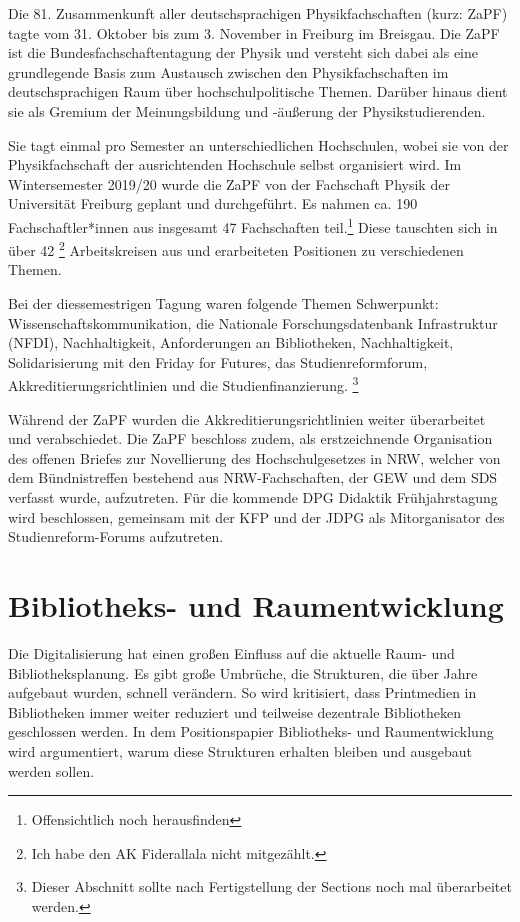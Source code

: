 Die 81. Zusammenkunft aller deutschsprachigen Physikfachschaften (kurz: ZaPF) tagte vom 31. Oktober bis zum 3. November in Freiburg im Breisgau. Die ZaPF ist die Bundesfachschaftentagung der Physik und versteht sich dabei als eine grundlegende Basis zum Austausch zwischen den Physikfachschaften im deutschsprachigen Raum über hochschulpolitische Themen. Darüber hinaus dient sie als Gremium der Meinungsbildung und -äußerung der Physikstudierenden.

Sie tagt einmal pro Semester an unterschiedlichen Hochschulen, wobei sie von der Physikfachschaft der ausrichtenden Hochschule selbst organisiert wird. 
Im Wintersemester 2019/20 wurde die ZaPF von der Fachschaft Physik der Universität Freiburg geplant und durchgeführt.  
Es nahmen ca. 190 Fachschaftler*innen aus insgesamt 47 Fachschaften teil.\footnote{Offensichtlich noch herausfinden}
Diese tauschten sich in über 42 \footnote{Ich habe den AK Fiderallala nicht mitgezählt.} Arbeitskreisen aus und erarbeiteten Positionen zu verschiedenen Themen.

Bei der diessemestrigen Tagung waren folgende Themen Schwerpunkt: Wissenschaftskommunikation, die Nationale Forschungsdatenbank Infrastruktur (NFDI), Nachhaltigkeit, Anforderungen an Bibliotheken, Nachhaltigkeit, Solidarisierung mit den Friday for Futures, das Studienreformforum, Akkreditierungsrichtlinien und die Studienfinanzierung. \footnote{Dieser Abschnitt sollte nach Fertigstellung der Sections noch mal überarbeitet werden.}

Während der ZaPF wurden die Akkreditierungsrichtlinien weiter überarbeitet und verabschiedet. Die ZaPF beschloss zudem, als erstzeichnende Organisation des offenen Briefes zur Novellierung des Hochschulgesetzes in NRW, welcher von dem Bündnistreffen bestehend aus NRW-Fachschaften, der GEW und dem SDS verfasst wurde, aufzutreten. Für die kommende DPG Didaktik Frühjahrstagung wird beschlossen, gemeinsam mit der KFP und der JDPG als Mitorganisator des Studienreform-Forums aufzutreten. 

\section*{Bibliotheks- und Raumentwicklung}
Die Digitalisierung hat einen großen Einfluss auf die aktuelle Raum- und Bibliotheksplanung. Es gibt große Umbrüche, die Strukturen, die über Jahre aufgebaut wurden, schnell verändern. So wird kritisiert, dass Printmedien in Bibliotheken immer weiter reduziert und teilweise dezentrale Bibliotheken geschlossen werden. In dem Positionspapier \glqq Bibliotheks- und Raumentwicklung\grqq{} wird argumentiert, warum diese Strukturen erhalten bleiben und ausgebaut werden sollen.

